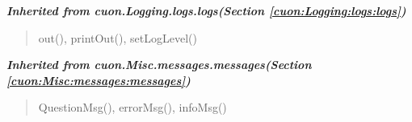 \large{\textbf{\textit{Inherited from cuon.Logging.logs.logs\textit{(Section \ref{cuon:Logging:logs:logs})}}}}

\begin{quote}
out(), printOut(), setLogLevel()
\end{quote}

\large{\textbf{\textit{Inherited from cuon.Misc.messages.messages\textit{(Section \ref{cuon:Misc:messages:messages})}}}}

\begin{quote}
QuestionMsg(), errorMsg(), infoMsg()
\end{quote}
